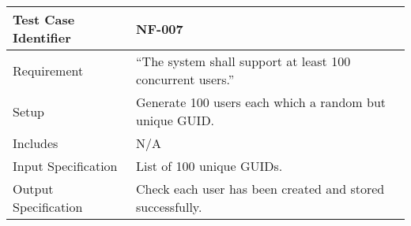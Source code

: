 \documentclass{l3deliverable}
\begin{document}
\begin{tabular}{lp{10cm}}
\hline 
\textbf{Test Case Identifier} & NF-007\tabularnewline
\hline 
\hline 
Requirement & ``The system shall support at least 100 concurrent users.'' \tabularnewline
\hline 
Setup & Generate 100 users each which a random but unique GUID. \tabularnewline
\hline 
Includes & N/A \tabularnewline
\hline 
Input Specification &  List of 100 unique GUIDs. \tabularnewline
\hline 
Output Specification & Check each user has been created and stored successfully. \tabularnewline
\hline 
\end{tabular}\\
\end{document}

